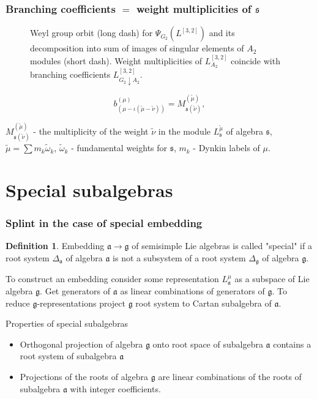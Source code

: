 \documentclass[pdftex]{beamer}
\newcommand{\gf}{\mathfrak{g}}
\newcommand{\af}{\mathfrak{a}}
\newcommand{\sfr}{\mathfrak{s}}
\theoremstyle{definition} \newtheorem{Def}{Definition}
\begin{document}
\begin{frame}
  \frametitle{Branching coefficients $=$ weight multiplicities of $\mathfrak{s}$}
  
  \begin{figure}[h!bt]
    \noindent{}\vspace{-0.3cm}
    \caption{Weyl group orbit  (long dash) for  $\Psi_{G_{2}}(L^{[3,2]})$ and its decomposition into sum of images of singular elements of   $A_{2}$ modules (short dash). Weight multiplicities of  $L^{[3,2]}_{A_{2}}$ coincide with branching coefficients $L^{[3,2]}_{G_{2}\downarrow A_{2}}$.}
    \label{fig:g2_splint}
  \end{figure}\vspace{-0.3cm}
  \begin{equation*}
    b_{(\mu-\iota (\tilde{\mu}-\tilde{\nu}))}^{(\mu)}=M_{\sfr (\tilde{\nu})}^{(\tilde{\mu})}, 
  \end{equation*}

  $M^{(\tilde\mu)}_{\sfr(\tilde\nu)}$ - the multiplicity of the weight $\tilde\nu$ in the module $L^{\tilde\mu}_{\sfr}$ of algebra $\sfr$,\\
  $\tilde\mu=\sum m_k \tilde\omega_k$,  $\tilde\omega_k$ - fundamental weights for $\sfr$, $m_k$ - Dynkin labels of $\mu$.
\end{frame}
\section{Special subalgebras}
\begin{frame}
  \frametitle{Splint in the case of special embedding}
  \begin{Def}
    Embedding $\af \rightarrow \gf $ of semisimple Lie algebras is called "special"{ }if a root system $ \Delta _ {\af} $ of algebra $ \af $ is not a subsystem of a root system $ \Delta _ {\gf} $ of algebra $ \gf $.
  \end{Def}
  To construct an embedding consider some representation $L^{\mu}_{\af}$ as a subspace of Lie algebra $\gf$. Get generators of $\af$ as linear combinations of generators of $\gf$. To reduce $\gf$-representations project $\gf$ root system to Cartan subalgebra of $\af$. 

  Properties of special subalgebras \cite {d}
  \begin{itemize}
  \item Orthogonal projection of algebra $\gf$ onto root space of subalgebra $\af$ contains a root system of subalgebra $\af$ 
  \item Projections of the roots of algebra $\gf$ are linear combinations of the roots of subalgebra $\af$ with integer coefficients.
  \end{itemize}
\end{frame}
\end{document}
